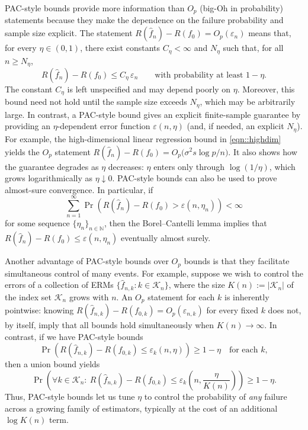 \documentclass[11pt]{article}
\theoremstyle{plain}
\theoremstyle{definition} %
\begin{document}
PAC-style bounds provide more information than \(O_p\) (big-Oh in probability) statements because they make the dependence on the failure probability and sample size explicit.
The statement \(R(\hat f_n)-R(f_0)=O_p(\varepsilon_n)\) means that, for every \(\eta\in(0,1)\), there exist constants \(C_\eta<\infty\) and \(N_\eta\) such that, for all \(n\ge N_\eta\),
\[
R(\hat f_n)-R(f_0)\le C_\eta\,\varepsilon_n
\qquad\text{with probability at least }1-\eta.
\]
The constant \(C_\eta\) is left unspecified and may depend poorly on \(\eta\).
Moreover, this bound need not hold until the sample size exceeds \(N_\eta\), which may be arbitrarily large.
In contrast, a PAC-style bound gives an explicit finite-sample guarantee by providing an \(\eta\)-dependent error function \(\varepsilon(n,\eta)\) (and, if needed, an explicit \(N_{\eta}\)). For example, the high-dimensional linear regression bound in \eqref{eqn::highdim} yields the \(O_p\) statement
\(R(\hat f_n)-R(f_0)=O_p\bigl(\sigma^2 s\log p/n\bigr)\).
It also shows how the guarantee degrades as \(\eta\) decreases: \(\eta\) enters only through \(\log(1/\eta)\), which grows logarithmically as \(\eta\downarrow 0\). PAC-style bounds can also be used to prove almost-sure convergence. In particular, if
\[
\sum_{n=1}^\infty \Pr\!\left(R(\hat f_n)-R(f_0) > \varepsilon(n,\eta_n)\right) < \infty
\]
for some sequence \(\{\eta_n\}_{n\in\mathbb N}\), then the Borel--Cantelli lemma implies that \(R(\hat f_n)-R(f_0) \le \varepsilon(n,\eta_n)\) eventually almost surely.


Another advantage of PAC-style bounds over \(O_p\) bounds is that they facilitate simultaneous control of many events. For example, suppose we wish to control the errors of a collection of ERMs \(\{\hat f_{n,k}: k\in \mathcal{K}_n\}\), where the size \(K(n) := |\mathcal{K}_n|\) of the index set \(\mathcal{K}_n\) grows with \(n\). An \(O_p\) statement for each \(k\) is inherently pointwise: knowing \(R(\hat f_{n,k})-R(f_{0,k}) = O_p(\varepsilon_{n,k})\) for every fixed \(k\) does not, by itself, imply that all bounds hold simultaneously when \(K(n)\to\infty\). In contrast, if we have PAC-style bounds
\[
\Pr\left(R(\hat f_{n,k})-R(f_{0,k}) \le \varepsilon_k(n,\eta)\right)\ge 1-\eta
\quad\text{for each }k,
\]
then a union bound yields
\[
\Pr\left(\forall k\in \mathcal{K}_n:\ R(\hat f_{n,k})-R(f_{0,k}) \le \varepsilon_k\left(n,\frac{\eta}{K(n)}\right)\right)\ge 1-\eta.
\]
Thus, PAC-style bounds let us tune \(\eta\) to control the probability of \emph{any} failure across a growing family of estimators, typically at the cost of an additional \(\log K(n)\) term.
\end{document}
